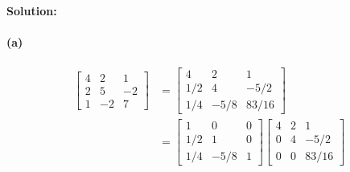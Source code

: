 \documentclass{article}  %
\begin{document}
        \paragraph{Solution:}
        \paragraph{(a)}
            \begin{align*}
            \left[                 %
              \begin{array}{rrr}   %
                4 & 2 & 1 \\
                2 & 5 & -2 \\
                1 & -2 & 7
              \end{array}
            \right]  &\bm=               %
            \left[                 %
              \begin{array}{rrr}   %
                4 & 2 & 1 \\
                1/2 & 4 & -5/2 \\
                1/4 & -5/8 & 83/16
              \end{array}
            \right] \\ &\bm=
            \left[                 %
              \begin{array}{rrr}   %
                1 & 0 & 0 \\
                1/2 & 1 & 0 \\
                1/4 & -5/8 & 1
              \end{array}
            \right]
            \left[                 %
              \begin{array}{rrr}   %
                4 & 2 & 1 \\
                0 & 4 & -5/2 \\
                0 & 0 & 83/16
              \end{array}
            \right]
        \end{align*}
\end{document}
